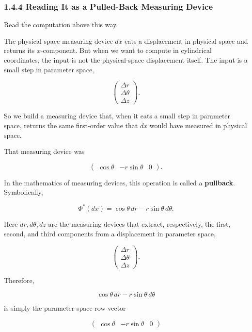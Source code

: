 \documentclass[a4paper,12pt,openany]{book}
\begin{document}
\hypertarget{reading-it-as-a-pulled-back-measuring-device}{%
\subsubsection{1.4.4 Reading It as a Pulled-Back Measuring
Device}\label{reading-it-as-a-pulled-back-measuring-device}}

Read the computation above this way.

The physical-space measuring device \(dx\) eats a displacement in
physical space and returns its \(x\)-component. But when we want to
compute in cylindrical coordinates, the input is not the physical-space
displacement itself. The input is a small step in parameter space,

\[
\begin{pmatrix}
\Delta r\\
\Delta\theta\\
\Delta z
\end{pmatrix}.
\]

So we build a measuring device that, when it eats a small step in
parameter space, returns the same first-order value that \(dx\) would
have measured in physical space.

That measuring device was

\[
\begin{pmatrix}
\cos\theta & -r\sin\theta & 0
\end{pmatrix}.
\]

In the mathematics of measuring devices, this operation is called a
\textbf{pullback}. Symbolically,

\[
\Phi^*(dx)
=
\cos\theta\,dr-r\sin\theta\,d\theta.
\]

Here \(dr,d\theta,dz\) are the measuring devices that extract,
respectively, the first, second, and third components from a
displacement in parameter space,

\[
\begin{pmatrix}
\Delta r\\
\Delta\theta\\
\Delta z
\end{pmatrix}.
\]

Therefore,

\[
\cos\theta\,dr-r\sin\theta\,d\theta
\]

is simply the parameter-space row vector

\[
\begin{pmatrix}
\cos\theta & -r\sin\theta & 0
\end{pmatrix}
\]
\end{document}
